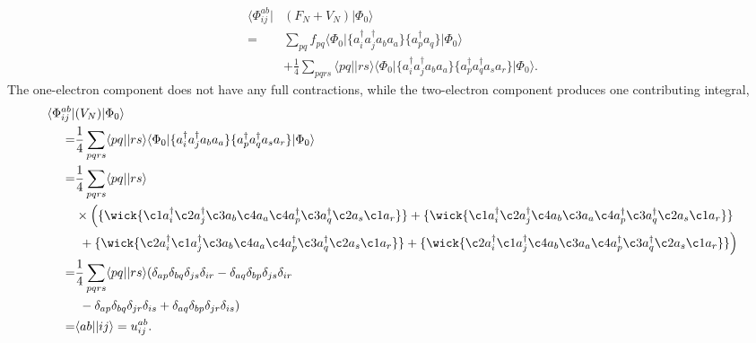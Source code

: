 \documentclass[
    a4paper, aps, twocolumn, floatfix, superscriptaddress,
    nofootinbib]{revtex4-1}
\newcommand{\1}{\mathds{1}}
\newcommand{\bra}[1]{\langle #1\lvert}
\newcommand{\ket}[1]{\rvert #1\rangle}
\begin{document}
    \begin{equation}
        \begin{aligned}
            \bra{\Phi_{ij}^{ab}} &(F_N + V_N)\ket{\Phi_0} \\
             =& \sum_{pq}f_{pq}\bra{\Phi_0}\{a_i^\dagger a_j^\dagger a_ba_a\}\{a^\dagger_pa_q\}\ket{\Phi_0} \\
             &+\frac{1}{4}\sum_{pqrs}\bra{pq}\ket{rs}
             \bra{\Phi_0}\{a_i^\dagger a_j^\dagger a_ba_a\}\{a^\dagger_pa^\dagger_qa_sa_r\}\ket{\Phi_0}.
        \end{aligned}
        \end{equation}
        The one-electron component does not have any full contractions, while the
        two-electron component produces one contributing integral,
        \begin{equation}
        \begin{aligned}
            \bra{\Phi_{ij}^{ab}} &(V_N)\ket{\Phi_0} \\
                =& \frac{1}{4}\sum_{pqrs}\bra{pq}\ket{rs}
             \bra{\Phi_0}\{a_i^\dagger a_j^\dagger a_ba_a\}\{a^\dagger_pa^\dagger_qa_sa_r\}\ket{\Phi_0} \\
                 =& \frac{1}{4} \sum_{pqrs} \bra{pq}\ket{rs} \\ &\times\Big(
                     \{ \wick{\c1 a^\dagger_i \c2 a^\dagger_j \c3 a_b \c4 a_a
                     \c4 a^\dagger_p \c3 a^\dagger_q \c2 a_s \c1 a_r}\}
                     +
                     \{ \wick{\c1 a^\dagger_i \c2 a^\dagger_j \c4 a_b \c3 a_a
                     \c4 a^\dagger_p \c3 a^\dagger_q \c2 a_s \c1 a_r}\} \\
                   &\ +
                      \{ \wick{\c2 a^\dagger_i \c1 a^\dagger_j \c3 a_b \c4 a_a
                     \c4 a^\dagger_p \c3 a^\dagger_q \c2 a_s \c1 a_r}\}
                     +
                     \{ \wick{\c2 a^\dagger_i \c1 a^\dagger_j \c4 a_b \c3 a_a
                     \c4 a^\dagger_p \c3 a^\dagger_q \c2 a_s \c1 a_r}\}
                 \Big) \\
                 =&  \frac{1}{4} \sum_{pqrs} \bra{pq}\ket{rs}
                 ( \delta_{ap}\delta_{bq}\delta_{js}\delta_{ir}
                  -\delta_{aq}\delta_{bp}\delta_{js}\delta_{ir} \\
                 &\ -\delta_{ap}\delta_{bq}\delta_{jr}\delta_{is}
                  +\delta_{aq}\delta_{bp}\delta_{jr}\delta_{is}) \\
                  =& \bra{ab}\ket{ij} = u^{ab}_{ij}.
        \end{aligned}
        \end{equation}
\end{document}

